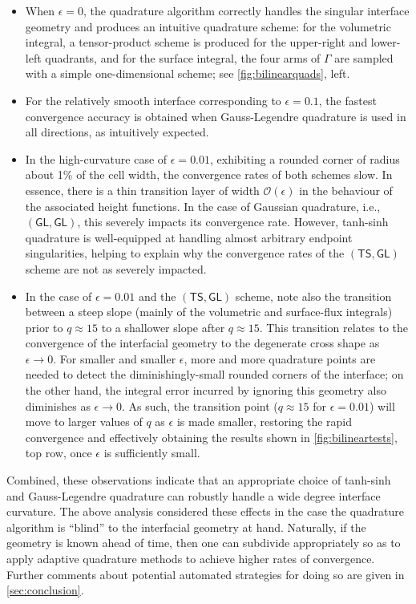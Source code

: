 \documentclass[onefignum,onetabnum,onealgnum,oneeqnum]{siamart190516}
\begin{document}
\begin{itemize}
\item When $\epsilon = 0$, the quadrature algorithm correctly handles the singular interface geometry and produces an intuitive quadrature scheme: for the volumetric integral, a tensor-product scheme is produced for the upper-right and lower-left quadrants, and for the surface integral, the four arms of $\Gamma$ are sampled with a simple one-dimensional scheme; see \cref{fig:bilinearquads}, left.
\item For the relatively smooth interface corresponding to $\epsilon = 0.1$, the fastest convergence accuracy is obtained when Gauss-Legendre quadrature is used in all directions, as intuitively expected.
\item In the high-curvature case of $\epsilon = 0.01$, exhibiting a rounded corner of radius about 1\% of the cell width, the convergence rates of both schemes slow. In essence, there is a thin transition layer of width $\mathcal O(\epsilon)$ in the behaviour of the associated height functions. In the case of Gaussian quadrature, i.e., $(\mathsf{GL},\mathsf{GL})$, this severely impacts its convergence rate. However, tanh-sinh quadrature is well-equipped at handling almost arbitrary endpoint singularities, helping to explain why the convergence rates of the $(\mathsf{TS},\mathsf{GL})$ scheme are not as severely impacted.
\item In the case of $\epsilon = 0.01$ and the $(\mathsf{TS},\mathsf{GL})$ scheme, note also the transition between a steep slope (mainly of the volumetric and surface-flux integrals) prior to $q \approx 15$ to a shallower slope after $q \approx 15$. This transition relates to the convergence of the interfacial geometry to the degenerate cross shape as $\epsilon \to 0$. For smaller and smaller $\epsilon$, more and more quadrature points are needed to detect the diminishingly-small rounded corners of the interface; on the other hand, the integral error incurred by ignoring this geometry also diminishes as $\epsilon \to 0$. As such, the transition point ($q \approx 15$ for $\epsilon = 0.01$) will move to larger values of $q$ as $\epsilon$ is made smaller, restoring the rapid convergence and effectively obtaining the results shown in \cref{fig:bilineartests}, top row, once $\epsilon$ is sufficiently small.
\end{itemize}
Combined, these observations indicate that an appropriate choice of tanh-sinh and Gauss-Legendre quadrature can robustly handle a wide degree interface curvature. The above analysis considered these effects in the case the quadrature algorithm is ``blind'' to the interfacial geometry at hand. Naturally, if the geometry is known ahead of time, then one can subdivide appropriately so as to apply adaptive quadrature methods to achieve higher rates of convergence. Further comments about potential automated strategies for doing so are given in \cref{sec:conclusion}.
\end{document}
